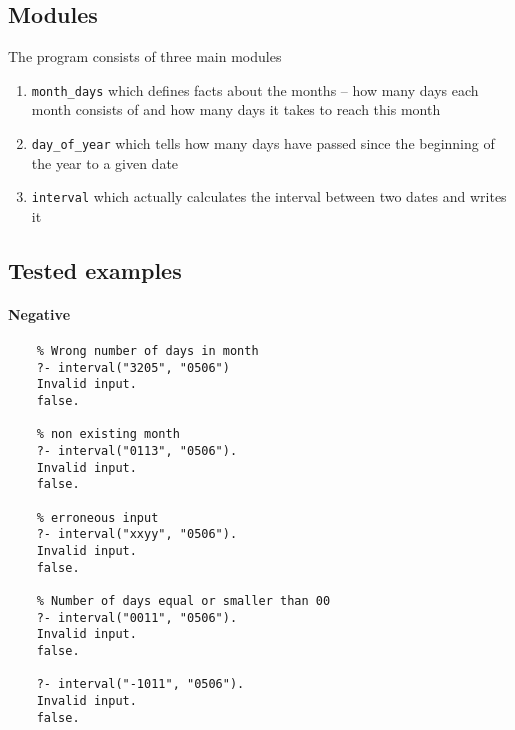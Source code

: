 \documentclass{article}[12pt]
\begin{document}
\subsection{Modules}
The program consists of three main modules \\ 
\begin{enumerate}
    \item \lstinline{month_days} which defines facts about the months -- how many days each month consists of and how many days it takes to reach this month
    \item \lstinline{day_of_year} which tells how many days have passed since the beginning of the year to a given date
    \item \lstinline{interval} which actually calculates the interval between two dates and writes it
\end{enumerate}

\subsection{Tested examples}
\paragraph{Negative}
\begin{lstlisting}
    % Wrong number of days in month
    ?- interval("3205", "0506")
    Invalid input.
    false.
    
    % non existing month
    ?- interval("0113", "0506").
    Invalid input.
    false.

    % erroneous input
    ?- interval("xxyy", "0506").
    Invalid input.
    false.

    % Number of days equal or smaller than 00
    ?- interval("0011", "0506").
    Invalid input.
    false.

    ?- interval("-1011", "0506").
    Invalid input.
    false.
\end{lstlisting}
\end{document}

